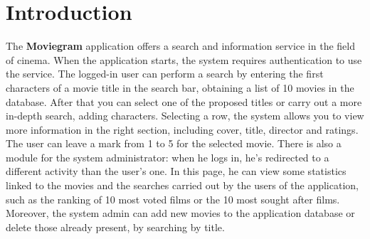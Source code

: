 \documentclass[a4paper, oneside]{article}
\begin{document}
\baselineskip 13pt

\begin{frontespizio} 
 \Preambolo{\renewcommand{\frontpretitlefont}{\fontsize{15}{12}\scshape}}
\Rientro {1cm}
 \Punteggiatura {}
\end{frontespizio}

\clearpage

	\tableofcontents\thispagestyle{empty}
	\clearpage


\section{Introduction}
The \textbf{Moviegram} application offers a search and information service in the field of cinema. When the application starts, the system requires authentication to use the service.
The logged-in user can perform a search by entering the first characters of a movie title in the search bar, obtaining a list of 10 movies in the database. After that you can select one of the proposed titles or carry out a more in-depth search, adding characters.
Selecting a row, the system allows you to view more information in the right section, including cover, title, director and ratings.
The user can leave a mark from 1 to 5 for the selected movie.
There is also a module for the system administrator: when he logs in, he's redirected to a different activity than the user's one. In this page, he can view some statistics linked to the movies and the searches carried out by the users of the application, such as the ranking of 10 most voted films or the 10 most sought after films.
Moreover, the system admin can add new movies to the application database or delete those already present, by searching by title.
\end{document}
